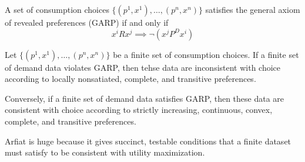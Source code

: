 \begin{definition}[GARP]
  A set of consumption choices $\{(p^1,x^1), \dots, (p^n, x^n)\}$
  satisfies the general axiom of revealed preferences (GARP) if and
  only if
  \[
  x^i R x^j \implies \neg (x^j P^D x^i)
  \]
\end{definition}

\begin{prop}[Arfiat 1967]
  Let $\{(p^1,x^1), \dots, (p^n,x^n)\}$ be a finite set of consumption
  choices.  If a finite set of demand data violates GARP, then tehse
  data are inconsistent with choice according to locally nonsatiated,
  complete, and transitive preferences.

  Conversely, if a finite set of demand data satisfies GARP, then
  these data are consistent with choice according to strictly
  increasing, continuous, convex, complete, and transitive
  preferences.
\end{prop}

Arfiat is huge because it gives succinct, testable conditions that a
finite dataset must satisfy to be consistent with utility
maximization.